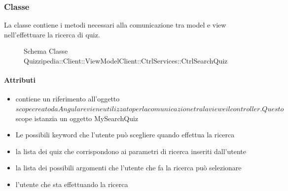 \subsubsection{Classe }
La classe contiene i metodi necessari alla comunicazione tra model e view nell'effettuare la ricerca di quiz.
\begin{figure}[H]
\centering
\noindent{}
\caption[Schema Classe CtrlSearchQuiz]{Schema Classe Quizzipedia::Client::ViewModelClient::CtrlServices::CtrlSearchQuiz}
\end{figure}
\paragraph{Attributi}
\begin{itemize}
\item {}
\newline
contiene un riferimento all'oggetto $scope creato da Angular e viene utilizzato per la comunicazione tra la view e il controller. Questo $scope istanzia un oggetto MySearchQuiz
\item {}
\newline
Le possibili keyword che l'utente può scegliere quando effettua la ricerca
\item {}
\newline
la lista dei quiz che corrispondono ai parametri di ricerca inseriti dall'utente
\item {}
\newline
la lista dei possibili argomenti che l'utente che fa la ricerca può selezionare
\item {}
\newline
l'utente che sta effettuando la ricerca
\end{itemize}
